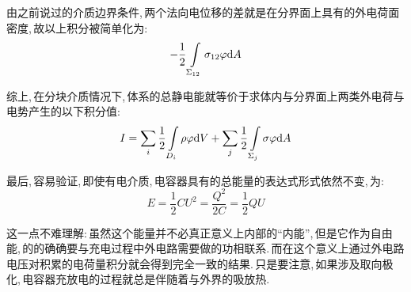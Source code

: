 由之前说过的介质边界条件,\,两个法向电位移的差就是在分界面上具有的外电荷面密度,\,故以上积分被简单化为:
\[-\frac{1}{2}\int\limits_{\Sigma_{12}} \sigma_{12}\varphi\textrm{d} A\]

综上,\,在分块介质情况下,\,体系的总静电能就等价于求体内与分界面上两类外电荷与电势产生的以下积分值:
\[I=\sum_i \frac{1}{2}\int\limits_{D_i}\rho \varphi \textrm{d} V+\sum_j\frac{1}{2}\int\limits_{\Sigma_j} \sigma\varphi\textrm{d} A\]

最后,\,容易验证,\,即使有电介质,\,电容器具有的总能量的表达式形式依然不变,\,为:
\[E=\frac{1}{2}CU^2=\frac{Q^2}{2C}=\frac{1}{2}QU\]

这一点不难理解:\,虽然这个能量并不必真正意义上内部的``内能'',\,但是它作为自由能,\,的的确确要与充电过程中外电路需要做的功相联系.\,而在这个意义上通过外电路电压对积累的电荷量积分就会得到完全一致的结果.\,只是要注意,\,如果涉及取向极化,\,电容器充放电的过程就总是伴随着与外界的吸放热.
